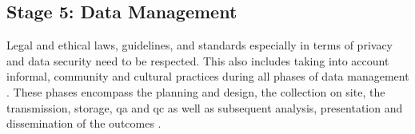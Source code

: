 \subsection{Stage 5: Data Management}\label{subsec:stage5_design}

Legal and ethical laws, guidelines, and standards especially in terms of privacy and data security need to be respected. This also includes taking into account informal, community and cultural practices during all phases of data management \autocite[017]{ifrcCommunityBasedSurveillanceGuiding2017}. These phases encompass the planning and design, the collection on site, the transmission, storage, \acrfull{qa} and \acrfull{qc} as well as subsequent analysis, presentation and dissemination of the outcomes \autocite{fraislCitizenScienceEnvironmental2022}.\newline
